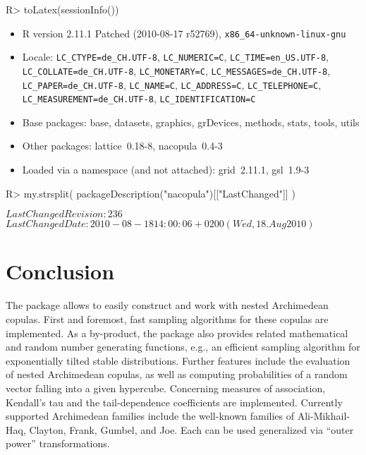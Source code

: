 \documentclass[nojss,article]{jss}
\theoremstyle{mythmstyle}
\begin{document}
\begin{Schunk}
\begin{Sinput}
R> toLatex(sessionInfo())
\end{Sinput}
\begin{itemize}\raggedright
  \item R version 2.11.1 Patched (2010-08-17 r52769), \verb|x86_64-unknown-linux-gnu|
  \item Locale: \verb|LC_CTYPE=de_CH.UTF-8|, \verb|LC_NUMERIC=C|, \verb|LC_TIME=en_US.UTF-8|, \verb|LC_COLLATE=de_CH.UTF-8|, \verb|LC_MONETARY=C|, \verb|LC_MESSAGES=de_CH.UTF-8|, \verb|LC_PAPER=de_CH.UTF-8|, \verb|LC_NAME=C|, \verb|LC_ADDRESS=C|, \verb|LC_TELEPHONE=C|, \verb|LC_MEASUREMENT=de_CH.UTF-8|, \verb|LC_IDENTIFICATION=C|
  \item Base packages: base, datasets, graphics, grDevices,
    methods, stats, tools, utils
  \item Other packages: lattice~0.18-8, nacopula~0.4-3
  \item Loaded via a namespace (and not attached):
    grid~2.11.1, gsl~1.9-3
\end{itemize}\end{Schunk}
\begin{Schunk}
\begin{Sinput}
R> my.strsplit(  packageDescription("nacopula")[["LastChanged"]]  )
\end{Sinput}
\end{Schunk}
\begin{Schunk}
\begin{Soutput}
$LastChangedRevision: 236 $
$LastChangedDate: 2010-08-18 14:00:06 +0200 (Wed, 18. Aug 2010) $
\end{Soutput}
\end{Schunk}

\section{Conclusion}
The package  allows to easily construct and work with nested
Archimedean copulas. First and foremost, fast sampling algorithms for these copulas
are implemented. As a by-product, the package also provides related mathematical
and random number generating functions, e.g., an efficient
sampling algorithm for exponentially tilted stable distributions. Further
features include the evaluation of nested Archimedean copulas, as well as
computing probabilities of a random vector falling into a given hypercube.
Concerning measures of association, Kendall's tau and the tail-dependence
coefficients are implemented. Currently supported Archimedean families include
the well-known families of Ali-Mikhail-Haq, Clayton, Frank, Gumbel, and
Joe. Each can be used generalized via ``outer power'' transformations.


\end{document}
